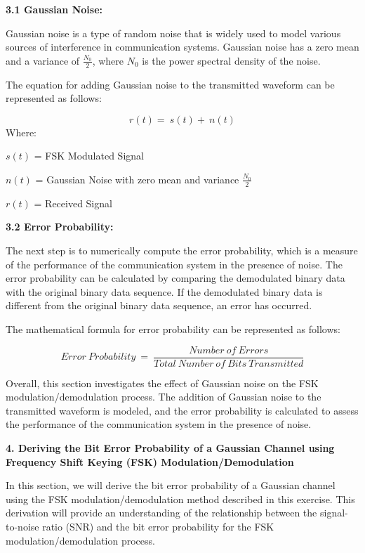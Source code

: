 \documentclass{article} %
\begin{document}
\noindent \textbf{3.1 Gaussian Noise:}

\noindent Gaussian noise is a type of random noise that is widely used to model various sources of interference in communication systems. Gaussian noise has a zero mean and a variance of  $\frac{N_0}{2}$, where $N_0$ is the power spectral density of the noise.

\noindent The equation for adding Gaussian noise to the transmitted waveform can be represented as follows:

\noindent 
\[r\left(t\right)=\ s\left(t\right)+\ n\left(t\right)\] 
Where: 

\noindent $s\left(t\right)$ = FSK Modulated Signal

\noindent $n\left(t\right)$ = Gaussian Noise with zero mean and variance  $\frac{N_0}{2}$

\noindent $r\left(t\right)$ = Received Signal

\noindent 

\noindent \textbf{3.2 Error Probability:}

\noindent The next step is to numerically compute the error probability, which is a measure of the performance of the communication system in the presence of noise. The error probability can be calculated by comparing the demodulated binary data with the original binary data sequence. If the demodulated binary data is different from the original binary data sequence, an error has occurred.

\noindent The mathematical formula for error probability can be represented as follows:

\noindent 
\[Error\ Probability\ =\ \frac{Number\ of\ Errors}{Total\ Number\ of\ Bits\ Transmitted}\] 


\noindent Overall, this section investigates the effect of Gaussian noise on the FSK modulation/demodulation process. The addition of Gaussian noise to the transmitted waveform is modeled, and the error probability is calculated to assess the performance of the communication system in the presence of noise.

\noindent 

\noindent \textbf{4. Deriving the Bit Error Probability of a Gaussian Channel using Frequency Shift Keying (FSK) Modulation/Demodulation}

\noindent In this section, we will derive the bit error probability of a Gaussian channel using the FSK modulation/demodulation method described in this exercise. This derivation will provide an understanding of the relationship between the signal-to-noise ratio (SNR) and the bit error probability for the FSK modulation/demodulation process.
\end{document}
